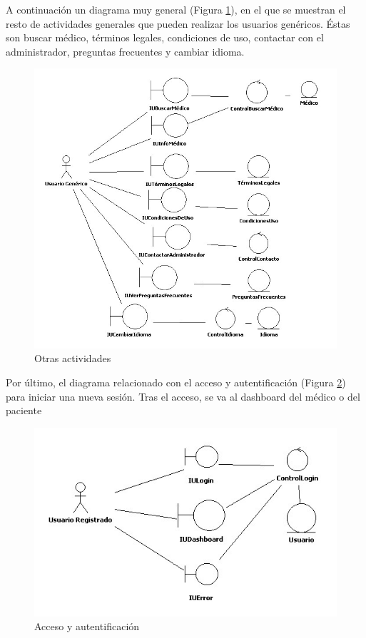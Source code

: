 	A continuación un diagrama muy general (Figura \ref{fig:col_clase9}), en el que se muestran el resto de actividades generales que pueden realizar los usuarios genéricos. Éstas son buscar médico, términos legales, condiciones de uso, contactar con el administrador, preguntas frecuentes y cambiar idioma.
	\begin{figure}[H]
	  \centering
	    \includegraphics[width=16cm]{img/jpg/clases/8_Varios.jpg}
	  \caption{Otras actividades}
	  \label{fig:col_clase9}
	\end{figure}
	
	\newpage
	Por último, el diagrama relacionado con el acceso y autentificación (Figura \ref{fig:col_clase10}) para iniciar una nueva sesión. Tras el acceso, se va al dashboard del médico o del paciente
	\begin{figure}[H]
	  \centering
	    \includegraphics[width=12cm]{img/jpg/clases/9_AccesoYAutentificacion.jpg}
	  \caption{Acceso y autentificación}
	  \label{fig:col_clase10}
	\end{figure}

